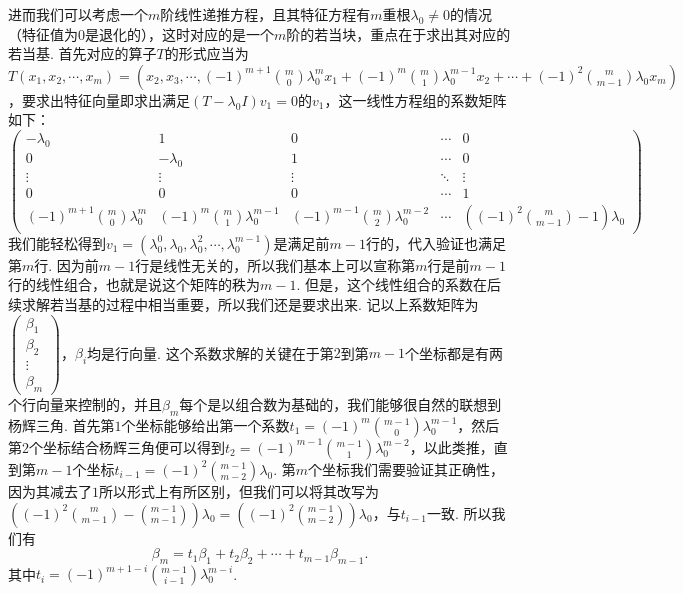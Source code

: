 进而我们可以考虑一个$m$阶线性递推方程，且其特征方程有$m$重根$\lambda_0 \neq 0$的情况（特征值为$0$是退化的），这时对应的是一个$m$阶的若当块，重点在于求出其对应的若当基. 首先对应的算子$T$的形式应当为$T(x_1, x_2, \cdots, x_m) = (x_2, x_3, \cdots, (-1)^{m + 1} \binom{m}{0} \lambda_0^m x_1 + (-1)^m \binom{m}{1} \lambda_0^{m - 1} x_2 + \cdots + (-1)^2 \binom{m}{m - 1} \lambda_0 x_{m})$，要求出特征向量即求出满足$(T - \lambda_0 I)v_1 = 0$的$v_1$，这一线性方程组的系数矩阵如下：\[
    \begin{pmatrix}
        -\lambda_0 & 1 & 0 & \cdots & 0 \\
        0 & -\lambda_0 & 1 & \cdots & 0 \\
        \vdots & \vdots & \vdots & \ddots & \vdots \\
        0 & 0 & 0 & \cdots & 1 \\
        (-1)^{m + 1} \binom{m}{0} \lambda_0^m & (-1)^m \binom{m}{1} \lambda_0^{m - 1} & (-1)^{m - 1} \binom{m}{2} \lambda_0^{m - 2} & \cdots & ((-1)^2 \binom{m}{m - 1} - 1) \lambda_0
    \end{pmatrix}
\]
我们能轻松得到$v_1 = (\lambda_0^0, \lambda_0, \lambda_0^2, \cdots, \lambda_0^{m - 1})$是满足前$m-1$行的，代入验证也满足第$m$行. 因为前$m-1$行是线性无关的，所以我们基本上可以宣称第$m$行是前$m-1$行的线性组合，也就是说这个矩阵的秩为$m-1$. 但是，这个线性组合的系数在后续求解若当基的过程中相当重要，所以我们还是要求出来. 记以上系数矩阵为$\begin{pmatrix}
    \beta_1 \\ \beta_2 \\ \vdots \\ \beta_m
\end{pmatrix}$，$\beta_i$均是行向量. 这个系数求解的关键在于第$2$到第$m-1$个坐标都是有两个行向量来控制的，并且$\beta_m$每个是以组合数为基础的，我们能够很自然的联想到杨辉三角. 首先第$1$个坐标能够给出第一个系数$t_1 = (-1)^m \binom{m - 1}{0} \lambda_0^{m - 1}$，然后第$2$个坐标结合杨辉三角便可以得到$t_2 = (-1)^{m - 1} \binom{m - 1}{1} \lambda_0^{m - 2}$，以此类推，直到第$m-1$个坐标$t_{i - 1} = (-1)^2 \binom{m-1}{m-2} \lambda_0$. 第$m$个坐标我们需要验证其正确性，因为其减去了$1$所以形式上有所区别，但我们可以将其改写为$((-1)^2 \binom{m}{m - 1} - \binom{m - 1}{m - 1}) \lambda_0 = ((-1)^2 \binom{m - 1}{m - 2}) \lambda_0$，与$t_{i-1}$一致. 所以我们有 \[
    \beta_m = t_1 \beta_1 + t_2 \beta_2 + \cdots + t_{m - 1} \beta_{m - 1}.
\]
其中$t_i = (-1)^{m + 1 - i} \binom{m - 1}{i - 1} \lambda_0^{m - i}$.

